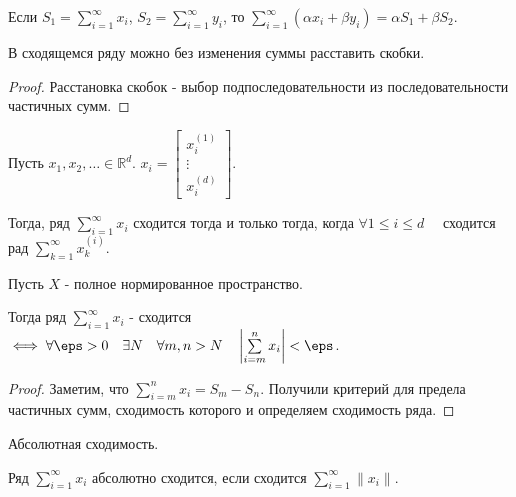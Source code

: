 \begin{properties} \thmslashn

    
\begin{theorem} \thmslashn

    Если $S_1 = \sum\limits_{i=1}^{\infty} x_{i}$, $S_2 = \sum\limits_{i=1}^{\infty} y_{i}$, то $\sum\limits_{i=1}^{\infty}(\alpha x_{i} + \beta y_{i}) = \alpha S_1 + \beta S_2$.
\end{theorem}
\begin{theorem} \thmslashn

    В сходящемся ряду можно без изменения суммы расставить скобки.
    \begin{proof} \thmslashn
    
        Расстановка скобок - выбор подпоследовательности из последовательности частичных сумм.
    \end{proof}
\end{theorem}
\begin{theorem} \thmslashn

    Пусть $x_1, x_2, \ldots\in \mathbb{R}^{d}$. $x_{i} = \begin{bmatrix} x_{i}^{(1)}\\ \vdots\\ x_{i}^{(d)} \end{bmatrix} $.

    Тогда, ряд $\sum\limits_{i=1}^{\infty} x_{i}$ сходится тогда и только тогда, когда $\forall{1 \le i \le d}\quad $ сходится рад $\sum\limits_{k=1}^{\infty} x_{k}^{(i)}$.
\end{theorem}
\end{properties}
\begin{theorem} \thmslashn

    Пусть $X$ - полное нормированное пространство.

    Тогда ряд $\sum\limits_{i=1}^{\infty} x_{i}$ - сходится $\iff \forall{\eps > 0}\quad \exists{N}\quad \forall{m, n > N}\quad \left| \sum\limits_{i=m}^{n} x_{i}\right| < \eps$.
    \begin{proof} \thmslashn
    
        Заметим, что $\sum\limits_{i=m}^{n}x_{i} = S_{m} - S_{n}$. Получили критерий для предела частичных сумм, сходимость которого и определяем сходимость ряда.
    \end{proof}
\end{theorem}
\begin{definition} \thmslashn 

    Абсолютная сходимость.

    Ряд $\sum\limits_{i=1}^{\infty} x_{i}$ абсолютно сходится, если сходится $\sum\limits_{i=1}^{\infty} \|x_{i}\|$.
\end{definition}
